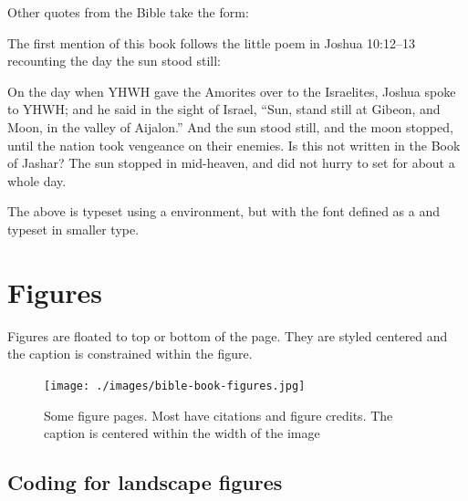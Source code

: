 Other quotes from the Bible take the form:
\medskip

The first mention of this
book follows the little poem in Joshua 10:12–13 recounting the day
the sun stood still:
\begin{smallverbatim}
On the day when YHWH gave the Amorites over to the Israelites,
Joshua spoke to YHWH; and he said in the sight of Israel,
“Sun, stand still at Gibeon,
and Moon, in the valley of Aijalon.”
And the sun stood still, and the moon stopped,
until the nation took vengeance on their enemies.
Is this not written in the Book of Jashar? 
The sun stopped in mid-heaven, and did
not hurry to set for about a whole day.
\end{smallverbatim}

\begin{macro}{\smallverbatim}
\begin{macro}{\smallverbatimfont}
The above is typeset using a \cmd{\smallverbatim} environment, but with the font defined as a \cmd{\smallverbatimfont}  and typeset in smaller type. 
\end{macro}
\end{macro}

\section{Figures}

Figures are floated to top or bottom of the page. They are styled centered and the caption is constrained within the figure.

\captionsetup{labelfont=bf, textfont=bf, justification=centering}

\begin{figure}[htbp]
\centering
\texttt{[image: ./images/bible-book-figures.jpg]}
\caption{\smallish Some figure pages. Most have citations and figure credits. The caption is centered within the width of the image}
\end{figure}


\subsection{Coding for landscape figures}

